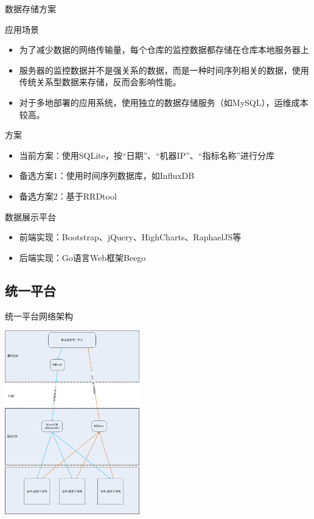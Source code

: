 \documentclass[CJK]{beamer}
\begin{document}
\begin{CJK*}{UTF8}{gbsn}
\begin{frame}{数据存储方案}
\begin{block}{应用场景}
\begin{itemize}
\item 为了减少数据的网络传输量，每个仓库的监控数据都存储在仓库本地服务器上
\item 服务器的监控数据并不是强关系的数据，而是一种时间序列相关的数据，使用传统关系型数据来存储，反而会影响性能。
\item 对于多地部署的应用系统，使用独立的数据存储服务（如MySQL），运维成本较高。
\end{itemize}
\end{block}
\begin{block}{方案}
\begin{itemize}
\item 当前方案：使用SQLite，按“日期”、“机器IP”、“指标名称”进行分库
\item 备选方案1：使用时间序列数据库，如InfluxDB
\item 备选方案2：基于RRDtool
\end{itemize}
\end{block}
\end{frame}

\begin{frame}{数据展示平台}
\begin{itemize}
\item 前端实现：Bootstrap、jQuery、HighCharts、RaphaelJS等
\item 后端实现：Go语言Web框架Beego
\end{itemize}
\end{frame}

\subsection{统一平台}
\begin{frame}{统一平台网络架构}
\begin{center}
\includegraphics[height=8cm]{union-platform.png}
\end{center}
\end{frame}


\end{CJK*}
\end{document}
